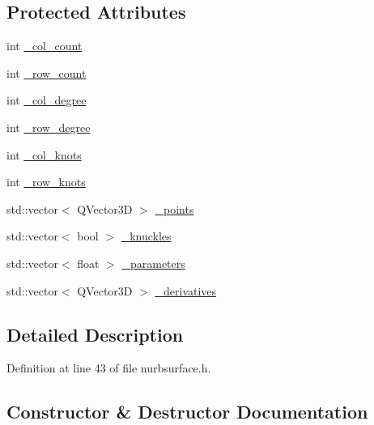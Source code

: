 \subsection*{Protected Attributes}
\begin{DoxyCompactItemize}
\item 
int \hyperlink{classShipCAD_1_1NURBSurface_aac0a2d528cec007b0fb6a154f3a67672}{\+\_\+col\+\_\+count}
\item 
int \hyperlink{classShipCAD_1_1NURBSurface_a251739da98a877b8d68722db5aa59371}{\+\_\+row\+\_\+count}
\item 
int \hyperlink{classShipCAD_1_1NURBSurface_a0192ed41981e4a3525f52be71ceb0e7c}{\+\_\+col\+\_\+degree}
\item 
int \hyperlink{classShipCAD_1_1NURBSurface_a0c53705ad7cc3004e60398f38909f59e}{\+\_\+row\+\_\+degree}
\item 
int \hyperlink{classShipCAD_1_1NURBSurface_a2b0e2649a54a57a9ae6fbeed031b04d0}{\+\_\+col\+\_\+knots}
\item 
int \hyperlink{classShipCAD_1_1NURBSurface_a3799680ea0e67d5d6c1a694f378e70ed}{\+\_\+row\+\_\+knots}
\item 
std\+::vector$<$ Q\+Vector3D $>$ \hyperlink{classShipCAD_1_1NURBSurface_a371421f0aec85ad3cffc3dbeeb0b26e4}{\+\_\+points}
\item 
std\+::vector$<$ bool $>$ \hyperlink{classShipCAD_1_1NURBSurface_a6f1765a2698b4ed79f0d110409129c28}{\+\_\+knuckles}
\item 
std\+::vector$<$ float $>$ \hyperlink{classShipCAD_1_1NURBSurface_a6de7536d23d408368f2df4470c1514af}{\+\_\+parameters}
\item 
std\+::vector$<$ Q\+Vector3D $>$ \hyperlink{classShipCAD_1_1NURBSurface_a6fa7cce7b1c78fc8fc89be24cba4d9b0}{\+\_\+derivatives}
\end{DoxyCompactItemize}


\subsection{Detailed Description}


Definition at line 43 of file nurbsurface.\+h.



\subsection{Constructor \& Destructor Documentation}
